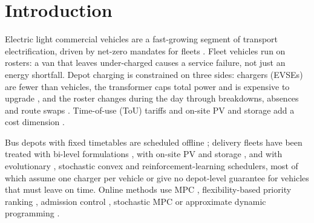 \documentclass[preprint,12pt]{elsarticle}
\begin{document}
\section{Introduction}
\label{sec:intro}

Electric light commercial vehicles are a fast-growing segment of transport electrification, driven by
net-zero mandates for fleets \cite{iea2025global,alhanahi2024charging}. Fleet vehicles run on rosters: a van
that leaves under-charged causes a service failure, not just an energy shortfall. Depot charging is
constrained on three sides: chargers (EVSEs) are fewer than vehicles, the transformer caps total power and
is expensive to upgrade \cite{motlagh2026review,keshavarzian2024optimal}, and the roster changes during the
day through breakdowns, absences and route swaps \cite{alhanahi2024charging,jack2025estimating,zhao2023toward}.
Time-of-use (ToU) tariffs and on-site PV and storage add a cost dimension \cite{corsetti2024commercial,chen2025optimal}.

Bus depots with fixed timetables are scheduled offline \cite{he2020optimal,hosseini2023optimizing,meng2024research,shi2022energy};
delivery fleets have been treated with bi-level formulations \cite{skugor2016bilevel}, with on-site PV and
storage \cite{dicorato2019integrated,vandermeer2018energy,chen2025optimal}, and with evolutionary
\cite{liu2023multiobjective}, stochastic convex \cite{qureshi2024multiobjective} and reinforcement-learning
\cite{orfanoudakis2025ev2gym,mei2026multiagent,vales2026emergent} schedulers, most of which assume one charger
per vehicle or give no depot-level guarantee for vehicles that must leave on time. Online methods use MPC
\cite{frendo2019realtime,tang2016model,lee2021adaptive}, flexibility-based priority ranking
\cite{lokhande2024realtime}, admission control \cite{alinia2020online}, stochastic MPC \cite{pozzi2022stochastic}
or approximate dynamic programming \cite{mahyari2025electric}.
\end{document}

